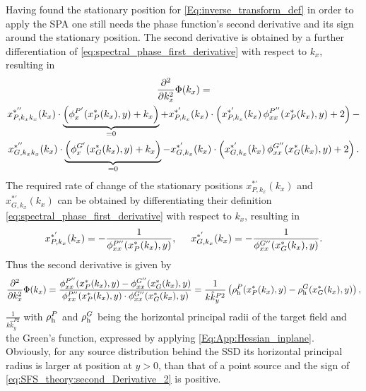 Having found the stationary position for \eqref{Eq:inverse_transform_def} in order to apply the SPA one still needs the phase function's second derivative and its sign around the stationary position.
The second derivative is obtained by a further differentiation of \eqref{eq:spectral_phase_first_derivative} with respect to $k_x$, resulting in
\begin{multline}
\small 
\frac{\partial^2}{\partial k_x^2}\Phi(k_x) = \\
  x^{*''}_{P,k_x k_x}(k_x) \cdot \underbrace{ \left( \phi^{P'}_x(x^*_P(k_x),y)  + k_x \right)}_{ = 0} + 
  x^{*'}_{P,k_x}(k_x) \cdot  \left( x^{*'}_{P,k_x}(k_x) \, \phi^{P''}_{xx}(x^*_P(k_x),y)  +2  \right)  -\\
  x^{*''}_{G,k_x k_x}(k_x) \cdot  \underbrace{ \left( \phi^{G'}_x(x^*_G(k_x),y)  + k_x \right) }_{ = 0} 
- x^{*'}_{G,k_x}(k_x) \cdot \left( x^{*'}_{G,k_x}(k_x) \,  \phi^{G''}_{xx}(x^*_G(k_x),y)  + 2\right).
\end{multline}
The required rate of change of the stationary positions $x^{*'}_{P,k_x}(k_x)$ and $x^{*'}_{G,k_x}(k_x)$ can be obtained by differentiating their definition \eqref{eq:spectral_phase_first_derivative} with respect to $k_x$, resulting in
\begin{equation}
x^{*'}_{P,k_x}(k_x) = -\frac{1}{\phi^{P''}_{xx}(x^*_P(k_x),y)}, \hspace{5mm} x^{*'}_{G,k_x}(k_x) = -\frac{1}{\phi^{G''}_{xx}(x^*_G(k_x),y)}.
\end{equation}
Thus the second derivative is given by
\begin{equation}
\label{eq:SFS_theory:second_Derivative_2}
\small
\frac{\partial^2}{\partial k_x^2}\Phi(k_x) = 
\frac{\phi^{P''}_{xx}(x^*_P(k_x),y) - \phi^{G''}_{xx}(x^*_G(k_x),y)}{\phi^{P''}_{xx}(x^*_P(k_x),y) \cdot \phi^{G''}_{xx}(x^*_G(k_x),y)} = 
\frac{1}{k\hat{k}^{P 2}_y} \left( \rho_\mathrm{h}^P(x^*_P(k_x),y) - \rho_\mathrm{h}^G(x^*_G(k_x),y) \right) 
,
\end{equation}
 $\frac{1}{k\hat{k}^{P 2}_y} $
with $\rho_\mathrm{h}^P$ and $\rho_\mathrm{h}^G$ being the horizontal principal radii of the target field and the Green's function, expressed by applying \eqref{Eq:App:Hessian_inplane}.
Obviously, for any source distribution behind the SSD its horizontal principal radius is larger at position at $y>0$, than that of a point source and the sign of \eqref{eq:SFS_theory:second_Derivative_2} is positive. 

